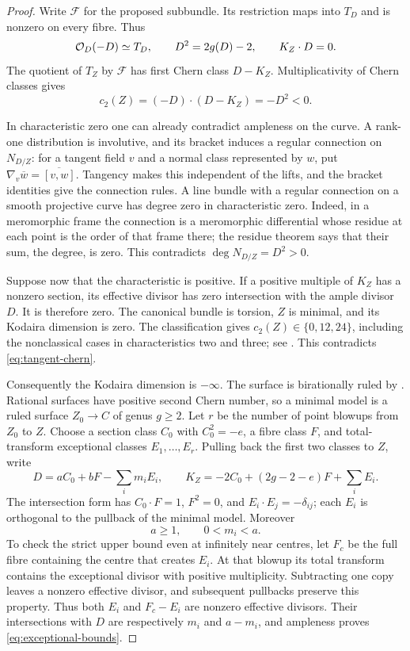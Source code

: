 \begin{proof}
Write $\mathcal F$ for the proposed subbundle. Its restriction maps into $T_D$ and is nonzero on every fibre. Thus
\[
 \mathcal O_D(-D)\simeq T_D,\qquad D^2=2g(D)-2,\qquad K_Z\cdot D=0.
\]
The quotient of $T_Z$ by $\mathcal F$ has first Chern class $D-K_Z$. Multiplicativity of Chern classes gives
\begin{equation}\label{eq:tangent-chern}
 c_2(Z)=(-D)\cdot(D-K_Z)=-D^2<0.
\end{equation}

In characteristic zero one can already contradict ampleness on the curve. A rank-one distribution is involutive, and its bracket induces a regular connection on $N_{D/Z}$: for a tangent field $v$ and a normal class represented by $w$, put $\nabla_v\overline w=\overline{[v,w]}$. Tangency makes this independent of the lifts, and the bracket identities give the connection rules. A line bundle with a regular connection on a smooth projective curve has degree zero in characteristic zero. Indeed, in a meromorphic frame the connection is a meromorphic differential whose residue at each point is the order of that frame there; the residue theorem says that their sum, the degree, is zero. This contradicts $\deg N_{D/Z}=D^2>0$.

Suppose now that the characteristic is positive. If a positive multiple of $K_Z$ has a nonzero section, its effective divisor has zero intersection with the ample divisor $D$. It is therefore zero. The canonical bundle is torsion, $Z$ is minimal, and its Kodaira dimension is zero. The classification gives $c_2(Z)\in\{0,12,24\}$, including the nonclassical cases in characteristics two and three; see \cite[\S7, author pp.~26--30]{Liedtke}. This contradicts \eqref{eq:tangent-chern}.

Consequently the Kodaira dimension is $-\infty$. The surface is birationally ruled by \cite[Theorems~4.4--4.5, author p.~21]{Liedtke}. Rational surfaces have positive second Chern number, so a minimal model is a ruled surface $Z_0\to C$ of genus $g\geq2$. Let $r$ be the number of point blowups from $Z_0$ to $Z$. Choose a section class $C_0$ with $C_0^2=-e$, a fibre class $F$, and total-transform exceptional classes $E_1,\ldots,E_r$. Pulling back the first two classes to $Z$, write
\[
 D=aC_0+bF-\sum_i m_iE_i,\qquad
 K_Z=-2C_0+(2g-2-e)F+\sum_iE_i.
\]
The intersection form has $C_0\cdot F=1$, $F^2=0$, and $E_i\cdot E_j=-\delta_{ij}$; each $E_i$ is orthogonal to the pullback of the minimal model. Moreover
\begin{equation}\label{eq:exceptional-bounds}
 a\geq1,\qquad 0<m_i<a.
\end{equation}
To check the strict upper bound even at infinitely near centres, let $F_c$ be the full fibre containing the centre that creates $E_i$. At that blowup its total transform contains the exceptional divisor with positive multiplicity. Subtracting one copy leaves a nonzero effective divisor, and subsequent pullbacks preserve this property. Thus both $E_i$ and $F_c-E_i$ are nonzero effective divisors. Their intersections with $D$ are respectively $m_i$ and $a-m_i$, and ampleness proves \eqref{eq:exceptional-bounds}.


\end{proof}
